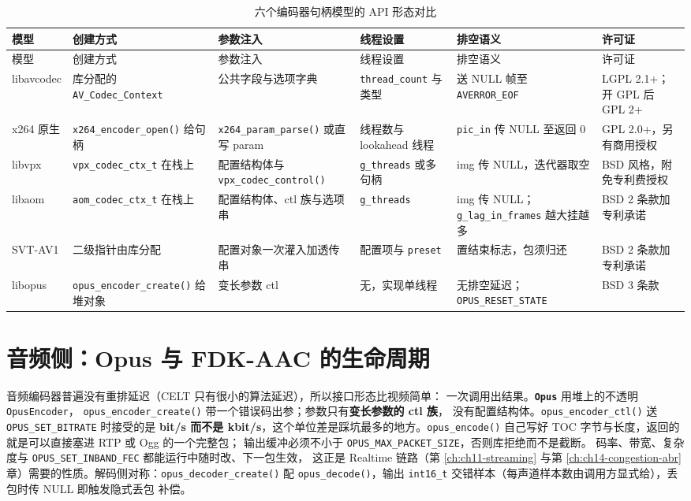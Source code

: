 \documentclass[12pt,a4paper,fontset=fandol]{ctexbook}
\newcommand{\Fn}[1]{\texttt{#1()}}
\newcommand{\Tp}[1]{\texttt{#1}}
\newcommand{\Bk}{\discretionary{}{}{}}
\newcommand{\Lib}[1]{\textbf{\texttt{#1}}}
\newcommand{\Lang}[1]{\textsf{#1}}
\newcommand{\DomRT}{\Lang{Realtime}}
\begin{document}
\begin{longtable}{@{}>{\raggedright\arraybackslash\footnotesize}p{} >{\raggedright\arraybackslash\footnotesize}p{} >{\raggedright\arraybackslash\footnotesize}p{} >{\raggedright\arraybackslash\footnotesize}p{} >{\raggedright\arraybackslash\footnotesize}p{} >{\raggedright\arraybackslash\footnotesize}p{}@{}}
\caption{六个编码器句柄模型的 API 形态对比}\label{tab:ch06-handles} \\
\toprule
模型 & 创建方式 & 参数注入 & 线程设置 & 排空语义 & 许可证 \\
\midrule
\endfirsthead
\toprule
模型 & 创建方式 & 参数注入 & 线程设置 & 排空语义 & 许可证 \\
\midrule
\endhead
\midrule
\bottomrule
\endlastfoot
libavcodec & 库分配的 \Tp{AV\Bk\_Codec\Bk\_Context} & 公共字段与选项字典 & \Tp{thread\Bk\_count} 与类型 & 送 NULL 帧至 \Tp{AVERROR\Bk\_EOF} & LGPL 2.1\Bk+；开 GPL 后 GPL 2\Bk+ \\
x264 原生 & \Fn{x264\Bk\_encoder\Bk\_open} 给句柄 & \Fn{x264\Bk\_param\Bk\_parse} 或直写 param & 线程数与 lookahead 线程 & \Tp{pic\_in} 传 NULL 至返回 0 & GPL 2.0\Bk+，另有商用授权 \\
libvpx & \Tp{vpx\Bk\_codec\Bk\_ctx\_t} 在栈上 & 配置结构体与 \Fn{vpx\Bk\_codec\Bk\_control} & \Tp{g\_threads} 或多句柄 & img 传 NULL，迭代器取空 & BSD 风格，附免专利费授权 \\
libaom & \Tp{aom\Bk\_codec\Bk\_ctx\_t} 在栈上 & 配置结构体、ctl 族与选项串 & \Tp{g\_threads} & img 传 NULL；\Tp{g\_lag\Bk\_in\Bk\_frames} 越大挂越多 & BSD 2 条款加专利承诺 \\
SVT-AV1 & 二级指针由库分配 & 配置对象一次灌入加透传串 & 配置项与 \Tp{preset} & 置结束标志，包须归还 & BSD 2 条款加专利承诺 \\
libopus & \Fn{opus\Bk\_encoder\Bk\_create} 给堆对象 & 变长参数 ctl & 无，实现单线程 & 无排空延迟；\Tp{OPUS\Bk\_RESET\Bk\_STATE} & BSD 3 条款 \\
\end{longtable}

\section{音频侧：Opus 与 FDK-AAC 的生命周期}

音频编码器普遍没有重排延迟（CELT 只有很小的算法延迟），所以接口形态比视频简单：
一次调用出结果。\Lib{Opus} 用堆上的不透明 \Tp{OpusEncoder}，
\Fn{opus\_encoder\_create} 带一个错误码出参；参数只有\textbf{变长参数的 ctl 族}，
没有配置结构体。\Fn{opus\_encoder\_ctl} 送 \Tp{OPUS\_SET\_BITRATE} 时接受的是
\textbf{bit/s 而不是 kbit/s}，这个单位差是踩坑最多的地方。\Fn{opus\_encode}
自己写好 TOC 字节与长度，返回的就是可以直接塞进 RTP 或 Ogg 的一个完整包；
输出缓冲必须不小于 \Tp{OPUS\_MAX\_PACKET\_SIZE}，否则库拒绝而不是截断。
码率、带宽、复杂度与 \Tp{OPUS\_SET\_INBAND\_FEC} 都能运行中随时改、下一包生效，
这正是 \DomRT{} 链路（第 \ref{ch:ch11-streaming} 与第 \ref{ch:ch14-congestion-abr}
章）需要的性质。解码侧对称：\Fn{opus\_decoder\_create} 配 \Fn{opus\_decode}，输出
\Tp{int16\_t} 交错样本（每声道样本数由调用方显式给），丢包时传 NULL 即触发隐式丢包
补偿。
\end{document}
